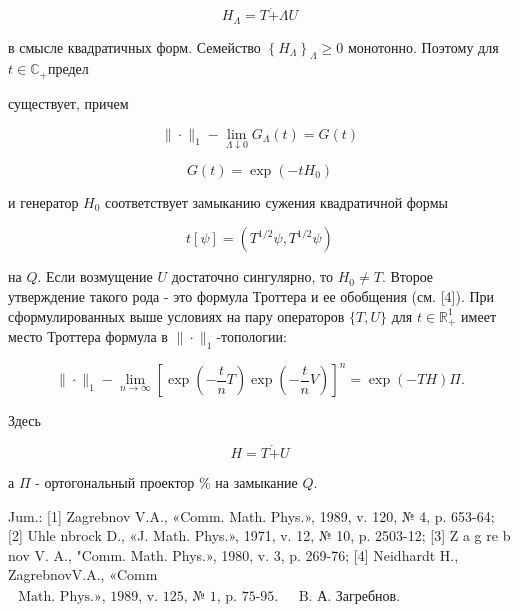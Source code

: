 \documentclass[10pt]{article}
\begin{document}
\[

H_{\Lambda}=T \dot{+} \Lambda U

\]



в смысле квадратичных форм. Семейство $\left\{H_{\Lambda}\right\}_{\Lambda} \geqslant 0$ монотонно. Поэтому для $t \in \mathbb{C}_{+}$предел



существует, причем



\[

\|\cdot\|_{1}-\lim _{\Lambda \downarrow 0} G_{\Lambda}(t)=G(t)

\]



\[

G(t)=\exp \left(-t H_{0}\right)

\]



и генератор $H_{0}$ соответствует замыканию сужения квадратичной формы



\[

t[\psi]=\left(T^{1 / 2} \psi, T^{1 / 2} \psi\right)

\]



на $Q$. Если возмущение $U$ достаточно сингулярно, то $H_{0} \neq T$. Второе утверждение такого рода - это формула Троттера и ее обобщения (см. [4]). При сформулированных выше условиях на пару операторов $\{T, U\}$ для $t \in \mathbb{R}_{+}^{1}$ имеет место Троттера формула в $\|\cdot\|_{1}$-топологии:



\[

\|\cdot\|_{1}-\lim _{n \rightarrow \infty}\left[\exp \left(-\frac{t}{n} T\right) \exp \left(-\frac{t}{n} V\right)\right]^{n}=\exp (-T H) \Pi .

\]



Здесь



\[

H=T \dot{+} U

\]



а $\Pi$ - ортогональный проектор $\mathscr{\%}$ на замыкание $Q$.



Jum.: [1] Zagrebnov V.A., «Comm. Math. Phys.», 1989, v. 120, № 4, p. 653-64; [2] Uhle nbrock D., «J. Math. Phys.», 1971, v. 12, № 10, p. 2503-12; [3] Z a g re b nov V. A., "Comm. Math. Phys.», 1980, v. 3, p. 269-76; [4] Neidhardt H., ZagrebnovV.A., «Comm $\begin{array}{ll}\text { Math. Phys.», 1989, v. 125, № 1, p. 75-95. } & \text { B. А. Загребнов. }\end{array}$
\end{document}
